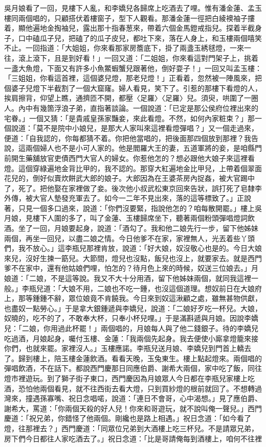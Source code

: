 \begin{showcontents}{}
吳月娘看了一回，見樓下人亂，和李嬌兒各歸席上吃酒去了哩。惟有潘金蓮、孟玉樓同兩個唱的，只顧搭伏着樓窗子，型下人觀看。那潘金蓮一徑把白綾襖袖子摟着，顯他遍地金掏袖兒，露出那十指春葱來，帶着六個金馬鐙戒指兒。探着半截身子，口中磕瓜子兒，把磕了的瓜子皮兒，都吐下來，落在人身上，和玉樓兩個嘻笑不止。一回指道：「大姐姐，你來看那家房簷底下，掛了兩盞玉綉毬燈，一來一往，滾上滾下，且是到好看！」一回又道：「二姐姐，你來看這對門架子上，挑着一盞大魚燈，下面又有許多小魚鱉蝦蟹兒跟著他，倒好耍子！」一回又叫孟玉樓：「三姐姐，你看這首裡，這個婆兒燈，那老兒燈！」正看着，忽然被一陣風來，把個婆子兒燈下半截割了一個大窟窿。婦人看見，笑下了。引惹的那樓下看燈的人，挨肩擦背，仰望上瞧，通擠匝不開，都壓〈足羅〉〈足羅〉兒。須臾，哄圍了一圈人。內中有幾箇浮浪子弟，直指著談論。一個說道：「已定是那公侯府位裡出來的宅眷。」一個又猜：「是貴戚皇孫家豔妾，來此看燈。不然，如何內家粧束？」那一個說道：「莫不是院中小娘兒，是那大人家叫來這裡看燈彈唱？」又一個走過來，便道：「自我認的，你每都猜不着。你把他當唱的，把後面那四個放到那裡？我告說，這兩個婦人也不是小可人家的。他是閻羅大王的妻，五道軍將的妾，是咱縣門前開生藥舖放官吏債西門大官人的婦女。你惹他怎的？想必跟他大娘子來這裡看燈。這個穿綠遍地金背比甲的，我不認的。那穿大紅遍地金比甲兒，上帶着個翠面花兒的，倒好似賣炊餅武大郎的娘子。大郎因為在王婆茶房內捉姦，被大官踢中了，死了。把他娶在家裡做了妾。後次他小叔武松東京回來告狀，誤打死了皂隸李外傳，被大官人墊發充軍去了。如今一二年不見出來，落的這等標致了。」正說著，只見一個多口過來，說道：「你們沒要緊，指說他怎的？咱每散開罷。」樓上吳月娘，見樓下人圍的多了，叫了金蓮、玉樓歸席坐下，聽著兩個粉頭彈唱燈詞飲酒。坐了一回，月娘要起身，說道：「酒勾了。我和他二娘先行一步，留下他姊妹兩個，再坐一回兒，以盡二娘之情。今日他爹不在家，家裡無人，光丟着些丫頭們，我不放心。」這李瓶兒那裡肯放，說道：「好大娘，奴沒敬心也是的。今日大娘來兒，沒好生揀一筯兒。大節間，燈兒也沒點，飯兒也沒上，就要家去。就是西門爹不在家中，還有他姑娘們哩，怕怎的？待月色上來的時候，奴送三位娘去。」月娘道：「二娘，不是這等說。我又不大十分用酒，留下他姊妹兩個，就同我這裡一般。」李瓶兒道：「大娘不用，二娘也不吃一鍾，也沒這個道理。想奴前日在大娘府上，那等鍾鍾不辭，眾位娘竟不肯饒我。今日來到奴這湫顧之處，雖無甚物供獻，也盡奴一點勞心。」于是拿大銀鍾遞與李嬌兒，說道：「二娘好歹吃一杯兒。大娘，奴曉的，吃不的了，不敢奉大杯，只奉小杯兒哩。」于是滿斟遞與月娘。因說李嬌兒：「二娘，你用過此杯罷！」兩個唱的，月娘每人與了他二錢銀子。待的李嬌兒吃過酒，月娘起身，囑付玉樓、金蓮：「我兩個先起身。我去便使小廝拿燈籠來接你們，也就來罷。家裡沒人。」玉樓應諾。李瓶兒送月娘、李嬌兒到門首上轎去了。歸到樓上，陪玉樓金蓮飲酒。看看天晚，玉兔東生。樓上點起燈來。兩個唱的彈唱飲酒，不在話下。都說西門慶那日同應伯爵、謝希大兩個，家中吃了飯，同往燈巿裡遊玩。到了獅子街子東口，西門慶因為月娘眾人今日都在李瓶兒家樓上吃酒，恐怕他兩個看見，就不往西街去看大燈，只到買紗燈的根前就回了。不想轉過灣來，撞遇孫寡嘴、祝日念唱喏，說道：「連日不會哥，心中渴想。」見了應伯爵、謝希大，罵道：「你兩個天殺的好人兒！你來和哥遊玩，就不說叫俺一聲兒。」西門慶道：「祝兄弟，你錯怪了他兩個。剛纔也是路上相遇。」祝日念道：「如今看了燈，往那裡去？」西門慶道：「同眾位兄弟到大酒樓上吃三杯兒。不是請眾兄弟，房下們今日都往人家吃酒去了。」祝日念道：「比是哥請俺每到酒樓上，咱何不往裡
\end{showcontents}
